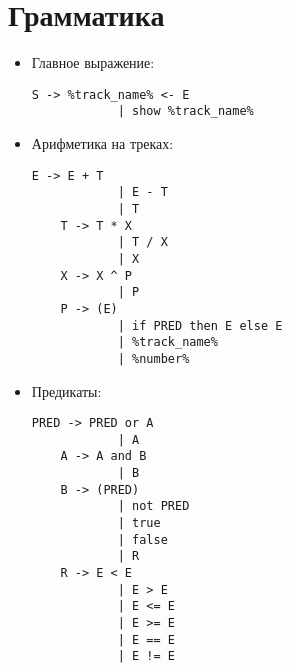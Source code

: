 \newpage
\section*{Грамматика}
\begin{itemize}
\item Главное выражение:

\begin{lstlisting}[style=nonumbers]
	S -> %track_name% <- E
			| show %track_name%
\end{lstlisting}

\item Арифметика на треках:

\begin{lstlisting}[style=nonumbers]
	E -> E + T
			| E - T
			| T
	T -> T * X
			| T / X
			| X
	X -> X ^ P
			| P
	P -> (E) 
			| if PRED then E else E
			| %track_name% 
			| %number%
\end{lstlisting}

\item Предикаты:

\begin{lstlisting}[style=nonumbers]
	PRED -> PRED or A
			| A
	A -> A and B
			| B
	B -> (PRED)
			| not PRED
			| true
			| false
			| R
	R -> E < E
			| E > E
			| E <= E
			| E >= E
			| E == E
			| E != E
\end{lstlisting}

\end{itemize}


